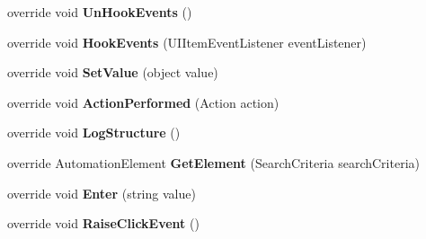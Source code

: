 \begin{DoxyCompactItemize}
\item 
\hypertarget{class_proto_test_1_1_golem_1_1_white_1_1_elements_1_1_white_group_box_a9599ce00d3f5e61e9a6bf529ca4190c4}{override void {\bfseries Un\-Hook\-Events} ()}\label{class_proto_test_1_1_golem_1_1_white_1_1_elements_1_1_white_group_box_a9599ce00d3f5e61e9a6bf529ca4190c4}

\item 
\hypertarget{class_proto_test_1_1_golem_1_1_white_1_1_elements_1_1_white_group_box_a58c7025ee14ff2114c34e4b2768bf0f9}{override void {\bfseries Hook\-Events} (U\-I\-Item\-Event\-Listener event\-Listener)}\label{class_proto_test_1_1_golem_1_1_white_1_1_elements_1_1_white_group_box_a58c7025ee14ff2114c34e4b2768bf0f9}

\item 
\hypertarget{class_proto_test_1_1_golem_1_1_white_1_1_elements_1_1_white_group_box_adbf727f620ef3071bdaf6e5080b51db4}{override void {\bfseries Set\-Value} (object value)}\label{class_proto_test_1_1_golem_1_1_white_1_1_elements_1_1_white_group_box_adbf727f620ef3071bdaf6e5080b51db4}

\item 
\hypertarget{class_proto_test_1_1_golem_1_1_white_1_1_elements_1_1_white_group_box_ad03cd5b4c296801f92b5206a1ca47978}{override void {\bfseries Action\-Performed} (Action action)}\label{class_proto_test_1_1_golem_1_1_white_1_1_elements_1_1_white_group_box_ad03cd5b4c296801f92b5206a1ca47978}

\item 
\hypertarget{class_proto_test_1_1_golem_1_1_white_1_1_elements_1_1_white_group_box_a442e46a617dd18e5a653fd02abe46eb8}{override void {\bfseries Log\-Structure} ()}\label{class_proto_test_1_1_golem_1_1_white_1_1_elements_1_1_white_group_box_a442e46a617dd18e5a653fd02abe46eb8}

\item 
\hypertarget{class_proto_test_1_1_golem_1_1_white_1_1_elements_1_1_white_group_box_a4d0b482a0e68df8759d228730337e306}{override Automation\-Element {\bfseries Get\-Element} (Search\-Criteria search\-Criteria)}\label{class_proto_test_1_1_golem_1_1_white_1_1_elements_1_1_white_group_box_a4d0b482a0e68df8759d228730337e306}

\item 
\hypertarget{class_proto_test_1_1_golem_1_1_white_1_1_elements_1_1_white_group_box_a8611a2ad72beaecc01b07aa744a2422a}{override void {\bfseries Enter} (string value)}\label{class_proto_test_1_1_golem_1_1_white_1_1_elements_1_1_white_group_box_a8611a2ad72beaecc01b07aa744a2422a}

\item 
\hypertarget{class_proto_test_1_1_golem_1_1_white_1_1_elements_1_1_white_group_box_a516a2066cdbf023f491940440a1eed7b}{override void {\bfseries Raise\-Click\-Event} ()}\label{class_proto_test_1_1_golem_1_1_white_1_1_elements_1_1_white_group_box_a516a2066cdbf023f491940440a1eed7b}

\end{DoxyCompactItemize}
